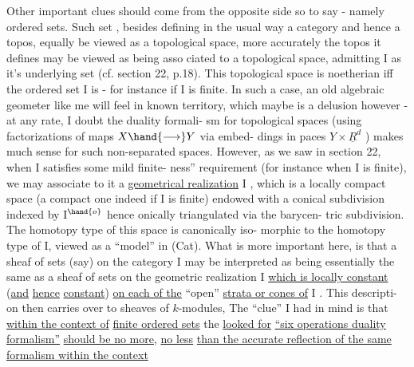 Other important clues should come from the opposite side so to say
- namely ordered sets.  Such  set ,  besides defining in the usual way
a  category and hence a topos,  equally  be viewed as a topological
space,  more accurately the topos it defines may be viewed as being asso%
ciated to a topological space,  admitting I as it's underlying set
(cf. section 22, p.18).  This topological space is noetherian iff the
ordered set I is -  for instance if I is finite.  In such a case, an 
old algebraic geometer like me will feel in known territory,  which
maybe is a delusion however - at any rate,  I doubt the duality formali-%
sm for topological spaces (using factorizations of maps $X\hand{\longrightarrow}Y$ via embed-%
dings in paces $Y\times\underline{R}^{d}$ ) makes much sense for such non-separated spaces.
However,  as we saw in section 22,  when I satisfies some mild  finite-%
ness'' requirement (for instance when I is finite),  we may associate to
it a \uline{geometrical realization} \hand{$|$}I\hand{$|$} ,  which is a locally compact space
(a compact one indeed if I is finite) endowed with a conical 
subdivision \hand{(}indexed by  I$^{\hand{o}}$\hand{)} hence onically triangulated via the barycen-%
tric subdivision\deleted{)}.  The homotopy type of this space is canonically iso-%
morphic to the homotopy type of I,  viewed as a ``model'' in (Cat).  What
is more important here,  is that a sheaf of sets (say) on the category
I  may be interpreted as being essentially the same as a sheaf of sets
on the geometric realization \hand{$|$}I\hand{$|$} \uline{which is locally constant} (\uline{and} \uline{hence}
\uline{constant}) \uline{on each of the} ``open'' \uline{strata or cones of}  I .  This descripti-%
on then carries over to sheaves of $k$-modules,  The ``clue'' I had in mind
is that \uline{within the context of}   \uline{finite ordered sets}\hand{,}   the
\uline{looked for} \uline{``six operations duality formalism''} \uline{should be no more,} \uline{no less}
\uline{than the accurate reflection of the same formalism within the context}


